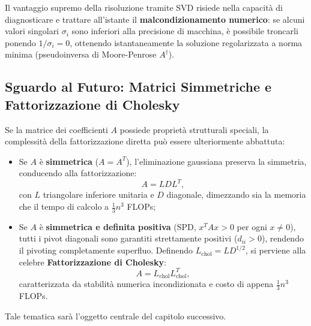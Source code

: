 Il vantaggio supremo della risoluzione tramite SVD risiede nella capacit\`a di diagnosticare e trattare all'istante il \textbf{malcondizionamento numerico}: se alcuni valori singolari $\sigma_i$ sono inferiori alla precisione di macchina, \`e possibile troncarli ponendo $1/\sigma_i = 0$, ottenendo istantaneamente la soluzione regolarizzata a norma minima (pseudoinversa di Moore-Penrose $A^\dagger$).

\subsection{Sguardo al Futuro: Matrici Simmetriche e Fattorizzazione di Cholesky}
Se la matrice dei coefficienti $A$ possiede propriet\`a strutturali speciali, la complessit\`a della fattorizzazione diretta pu\`o essere ulteriormente abbattuta:
\begin{itemize}
    \item Se $A$ \`e \textbf{simmetrica} ($A = A^T$), l'eliminazione gaussiana preserva la simmetria, conducendo alla fattorizzazione:
    \begin{equation}
        A = L D L^T,
    \end{equation}
    con $L$ triangolare inferiore unitaria e $D$ diagonale, dimezzando sia la memoria che il tempo di calcolo a $\frac{1}{3}n^3$ FLOPs;
    \item Se $A$ \`e \textbf{simmetrica e definita positiva} (SPD, $x^T A x > 0$ per ogni $x \neq 0$), tutti i pivot diagonali sono garantiti strettamente positivi ($d_{ii} > 0$), rendendo il pivoting completamente superfluo. Definendo $L_{\mathrm{chol}} = L D^{1/2}$, si perviene alla celebre \textbf{Fattorizzazione di Cholesky}:
    \begin{equation}
        A = L_{\mathrm{chol}} L_{\mathrm{chol}}^T,
    \end{equation}
    caratterizzata da stabilit\`a numerica incondizionata e costo di appena $\frac{1}{3}n^3$ FLOPs.
\end{itemize}
Tale tematica sar\`a l'oggetto centrale del capitolo successivo.
